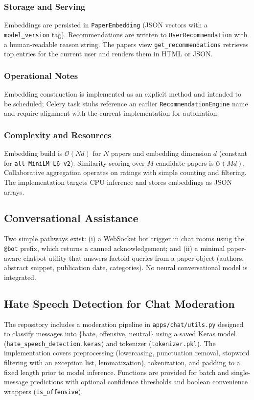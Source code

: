 \documentclass[conference]{IEEEtran}
\begin{document}
\subsubsection{Storage and Serving}
Embeddings are persisted in \texttt{PaperEmbedding} (JSON vectors with a \texttt{model\_version} tag). Recommendations are written to \texttt{UserRecommendation} with a human-readable reason string. The papers view \texttt{get\_recommendations} retrieves top entries for the current user and renders them in HTML or JSON.

\subsubsection{Operational Notes}
Embedding construction is implemented as an explicit method and intended to be scheduled; Celery task stubs reference an earlier \texttt{RecommendationEngine} name and require alignment with the current implementation for automation.

\subsubsection{Complexity and Resources}
Embedding build is \(\mathcal{O}(N d)\) for \(N\) papers and embedding dimension \(d\) (constant for \texttt{all-MiniLM-L6-v2}). Similarity scoring over \(M\) candidate papers is \(\mathcal{O}(M d)\). Collaborative aggregation operates on ratings with simple counting and filtering. The implementation targets CPU inference and stores embeddings as JSON arrays.

\subsection{Conversational Assistance}
Two simple pathways exist: (i) a WebSocket bot trigger in chat rooms using the \texttt{@bot} prefix, which returns a canned acknowledgement; and (ii) a minimal paper-aware chatbot utility that answers factoid queries from a paper object (authors, abstract snippet, publication date, categories). No neural conversational model is integrated.

\subsection{Hate Speech Detection for Chat Moderation}
The repository includes a moderation pipeline in \texttt{apps/chat/utils.py} designed to classify messages into \{hate, offensive, neutral\} using a saved Keras model (\texttt{hate\_speech\_detection.keras}) and tokenizer (\texttt{tokenizer.pkl}). The implementation covers preprocessing (lowercasing, punctuation removal, stopword filtering with an exception list, lemmatization), tokenization, and padding to a fixed length prior to model inference. Functions are provided for batch and single-message predictions with optional confidence thresholds and boolean convenience wrappers (\texttt{is\_offensive}).
\end{document}
